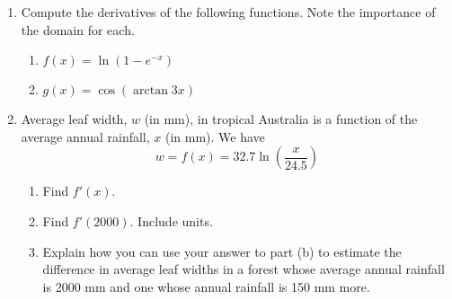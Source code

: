 \documentclass[12pt]{article}
\begin{document}
\begin{enumerate}
\item  Compute the derivatives of the following functions. Note the importance of the domain for each.
\begin{enumerate}
	\item $\displaystyle f(x)=\ln(1-e^{-x})$
	\vfill
	\item $\displaystyle g(x)=\cos(\arctan 3x) $
	\vfill
	\end{enumerate}


\item Average leaf width, $w$ (in mm), in tropical Australia is a function of the average annual rainfall, $x$ (in mm). We have $$w=f(x)=32.7 \ln\left(\frac{x}{24.5}\right)$$
	\begin{enumerate}
	\item Find $f'(x)$.
	\vfill
	\item Find $f'(2000)$. Include units.
	\vfill
	\item Explain how you can use your answer to part (b) to estimate the difference in average leaf widths in a forest whose average annual rainfall is 2000 mm and one whose annual rainfall is 150 mm more.
	\vfill
	\end{enumerate}



\end{enumerate}
\end{document}
